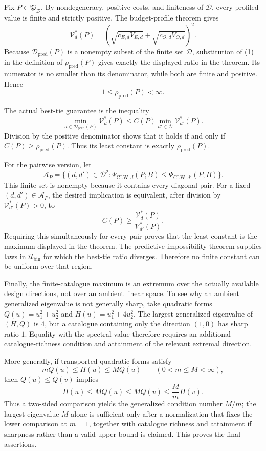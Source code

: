Fix \(P\in\mathfrak P_{\mathcal D}\).  By nondegeneracy, positive costs, and finiteness of \(\mathcal D\), every profiled value is finite and strictly positive.  The budget-profile theorem gives
\[
 \mathcal V_d^*(P)
 =(\sqrt{c_{E,d}V_{E,d}}+\sqrt{c_{O,d}V_{O,d}})^2. \tag{1}
\]
Because \(\mathcal D_{\mathrm{pred}}(P)\) is a nonempty subset of the finite set \(\mathcal D\), substitution of (1) in the definition of \(\rho_{\mathrm{pred}}(P)\) gives exactly the displayed ratio in the theorem.  Its numerator is no smaller than its denominator, while both are finite and positive.  Hence
\[
 1\le\rho_{\mathrm{pred}}(P)<\infty. \tag{2}
\]

The actual best-tie guarantee is the inequality
\[
 \min_{d\in\mathcal D_{\mathrm{pred}}(P)}\mathcal V_d^*(P)
 \le C(P)\min_{d'\in\mathcal D}\mathcal V_{d'}^*(P).
\]
Division by the positive denominator shows that it holds if and only if
\(C(P)\ge\rho_{\mathrm{pred}}(P)\).  Thus its least constant is exactly \(\rho_{\mathrm{pred}}(P)\).

For the pairwise version, let
\[
 \mathcal A_P=\{(d,d')\in\mathcal D^2:
 \Psi_{\mathrm{CLW},d}(P;B)\le
 \Psi_{\mathrm{CLW},d'}(P;B)\}.
\]
This finite set is nonempty because it contains every diagonal pair.  For a fixed \((d,d')\in\mathcal A_P\), the desired implication is equivalent, after division by \(\mathcal V_{d'}^*(P)>0\), to
\[
 C(P)\ge\frac{\mathcal V_d^*(P)}{\mathcal V_{d'}^*(P)}.
\]
Requiring this simultaneously for every pair proves that the least constant is the maximum displayed in the theorem.  The predictive-impossibility theorem supplies laws in \(\mathcal U_{\mathrm{bin}}\) for which the best-tie ratio diverges.  Therefore no finite constant can be uniform over that region.

Finally, the finite-catalogue maximum is an extremum over the actually available design directions, not over an ambient linear space.  To see why an ambient generalized eigenvalue is not generally sharp, take quadratic forms \(Q(u)=u_1^2+u_2^2\) and \(H(u)=u_1^2+4u_2^2\).  The largest generalized eigenvalue of \((H,Q)\) is \(4\), but a catalogue containing only the direction \((1,0)\) has sharp ratio \(1\).  Equality with the spectral value therefore requires an additional catalogue-richness condition and attainment of the relevant extremal direction.

More generally, if transported quadratic forms satisfy
\[
 mQ(u)\le H(u)\le MQ(u)\qquad(0<m\le M<\infty),
\]
then \(Q(u)\le Q(v)\) implies
\[
 H(u)\le MQ(u)\le MQ(v)\le\frac{M}{m}H(v). \tag{3}
\]
Thus a two-sided comparison yields the generalized condition number \(M/m\); the largest eigenvalue \(M\) alone is sufficient only after a normalization that fixes the lower comparison at \(m=1\), together with catalogue richness and attainment if sharpness rather than a valid upper bound is claimed.  This proves the final assertions.